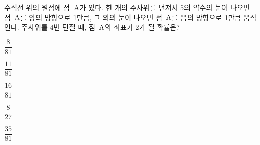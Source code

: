 수직선 위의 원점에 점~$\mathrm{A}$가 있다. 한 개의 주사위를 던져서 5의 약수의 눈이 나오면 점~$\mathrm{A}$를 양의 방향으로 1만큼, 그 외의 눈이 나오면 점~$\mathrm{A}$를 음의 방향으로 1만큼 움직인다. 주사위를 4번 던질 때, 점~$\mathrm{A}$의 좌표가 2가 될 확률은?
\begin{choices32}{\rule[-3ex]{0pt}{8ex}$\dfrac{8}{81}$}{\rule[-3ex]{0pt}{8ex}$\dfrac{11}{81}$}{\rule[-3ex]{0pt}{8ex}$\dfrac{16}{81}$}{\rule[-3ex]{0pt}{8ex}$\dfrac{8}{27}$}{\rule[-3ex]{0pt}{8ex}$\dfrac{35}{81}$}\end{choices32}
